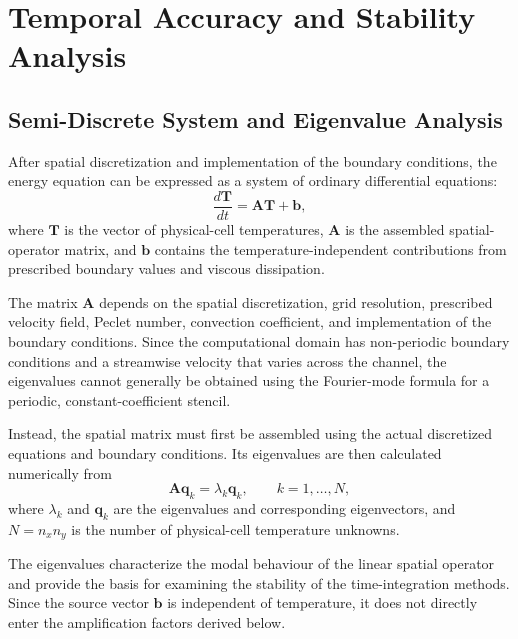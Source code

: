 \section{Temporal Accuracy and Stability Analysis}
\label{sec:stability_analysis}

\subsection{Semi-Discrete System and Eigenvalue Analysis}

After spatial discretization and implementation of the boundary
conditions, the energy equation can be expressed as a system of
ordinary differential equations:
\begin{equation}
\boxed{
\frac{d\mathbf{T}}{dt}
=
\mathbf{A}\mathbf{T}+\mathbf{b},
}
\label{eq:stability_semidiscrete}
\end{equation}
where $\mathbf{T}$ is the vector of physical-cell temperatures,
$\mathbf{A}$ is the assembled spatial-operator matrix, and
$\mathbf{b}$ contains the temperature-independent contributions
from prescribed boundary values and viscous dissipation.

The matrix $\mathbf{A}$ depends on the spatial discretization,
grid resolution, prescribed velocity field, Peclet number,
convection coefficient, and implementation of the boundary
conditions. Since the computational domain has non-periodic
boundary conditions and a streamwise velocity that varies
across the channel, the eigenvalues cannot generally be
obtained using the Fourier-mode formula for a periodic,
constant-coefficient stencil.

Instead, the spatial matrix must first be assembled using
the actual discretized equations and boundary conditions.
Its eigenvalues are then calculated numerically from
\begin{equation}
\boxed{
\mathbf{A}\mathbf{q}_k
=
\lambda_k\mathbf{q}_k,
\qquad k=1,\ldots,N,
}
\label{eq:spatial_eigenvalue_problem}
\end{equation}
where $\lambda_k$ and $\mathbf{q}_k$ are the eigenvalues
and corresponding eigenvectors, and $N=n_xn_y$ is the
number of physical-cell temperature unknowns.

The eigenvalues characterize the modal behaviour of the
linear spatial operator and provide the basis for examining
the stability of the time-integration methods. Since the
source vector $\mathbf{b}$ is independent of temperature,
it does not directly enter the amplification factors
derived below.


